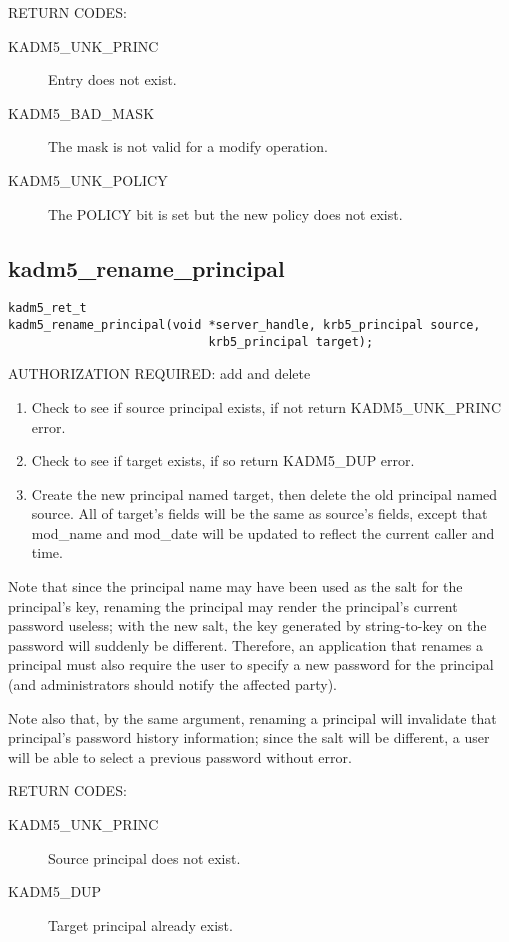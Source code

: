 RETURN CODES:

\begin{description}
\item[KADM5_UNK_PRINC] Entry does not exist.
\item[KADM5_BAD_MASK] The mask is not valid for a modify
operation.
\item[KADM5_UNK_POLICY] The POLICY bit is set but the new
policy does not exist.
\end{description}

\subsection{kadm5_rename_principal}

\begin{verbatim}
kadm5_ret_t
kadm5_rename_principal(void *server_handle, krb5_principal source,
                            krb5_principal target);
\end{verbatim}

AUTHORIZATION REQUIRED: add and delete

\begin{enumerate}
\item Check to see if source principal exists, if not return
KADM5_UNK_PRINC error. 
\item Check to see if target exists, if so return KADM5_DUP error.
\item Create the new principal named target, then delete the old
principal named source.  All of target's fields will be the same as
source's fields, except that mod_name and mod_date will be updated to
reflect the current caller and time.
\end{enumerate}

Note that since the principal name may have been used as the salt for
the principal's key, renaming the principal may render the principal's
current password useless; with the new salt, the key generated by
string-to-key on the password will suddenly be different.  Therefore,
an application that renames a principal must also require the user to
specify a new password for the principal (and administrators should
notify the affected party).

Note also that, by the same argument, renaming a principal will
invalidate that principal's password history information; since the
salt will be different, a user will be able to select a previous
password without error.

RETURN CODES: 

\begin{description}
\item[KADM5_UNK_PRINC] Source principal does not exist.
\item[KADM5_DUP] Target principal already exist.
\end{description}

